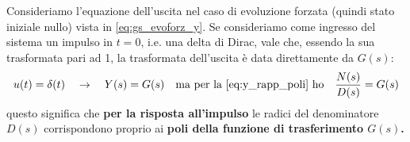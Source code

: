 \begin{prop}
Consideriamo l'equazione dell'uscita nel caso di evoluzione forzata (quindi stato iniziale nullo) vista in \eqref{eq:gs_evoforz_y}. Se consideriamo come ingresso del sistema un impulso in $t=0$, i.e. una delta di Dirac, vale che, essendo la sua trasformata pari ad 1, la trasformata dell'uscita è data direttamente da $G(s)$:
\begin{equation*}
u(t) = \delta(t) \quad \rightarrow \quad Y(s) = G(s) \quad \textrm{ma per la \eqref{eq:y_rapp_poli} ho} \quad \frac{N(s)}{D(s)} = G(s)
\end{equation*} 
questo significa che \textbf{per la risposta all'impulso} le radici del denominatore $D(s)$ corrispondono proprio ai \textbf{poli della funzione di trasferimento $G(s)$.}
\end{prop}

